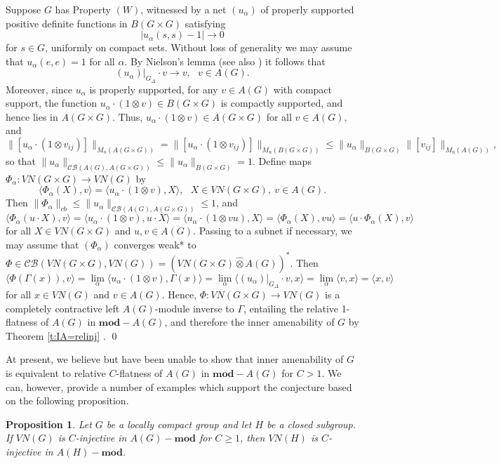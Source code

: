 \documentclass[preprint,12pt]{elsarticle}
\newtheorem{prop}[thm]{Proposition}
\newcommand{\mc}[1]{\mathcal{#1}}
\newcommand{\la}{\langle}
\newcommand{\ra}{\rangle}
\newcommand{\LG}{VN(G)}
\newcommand{\Gam}{\Gamma}
\newcommand{\ten}{\otimes}
\newcommand{\hten}{\widehat{\otimes}}
\providecommand{\norm}[1]{\lVert#1\rVert}
\begin{document}
\begin{pf} Suppose $G$ has Property $(W)$, witnessed by a net $(u_\alpha)$ of properly supported positive definite functions in $B(G\times G)$ satisfying
$$|u_\alpha(s,s)-1|\rightarrow 0$$
for $s\in G$, uniformly on compact sets. Without loss of generality we may assume that $u_\alpha(e,e)=1$ for all $\alpha$. By Nielson's lemma \cite[Lemma 10.3]{N} (see also \cite[Proposition 5.1]{dH}) it follows that
$$(u_\alpha)|_{G_\Delta}\cdot v\rightarrow v, \ \ \ v\in A(G).$$
Moreover, since $u_\alpha$ is properly supported, for any $v\in A(G)$ with compact support, the function $u_\alpha\cdot(1\ten v)\in B(G\times G)$ is compactly supported, and hence lies in $A(G\times G)$. Thus, $u_\alpha\cdot(1\ten v)\in A(G\times G)$ for all $v\in A(G)$, and
$$\norm{[u_\alpha\cdot(1\ten v_{ij})]}_{M_n(A(G\times G))}=\norm{[u_\alpha\cdot(1\ten v_{ij})]}_{M_n(B(G\times G))}\leq\norm{u_{\alpha}}_{B(G\times G)}\norm{[v_{ij}]}_{M_n(A(G))},$$
so that $\norm{u_\alpha}_{\mc{CB}(A(G),A(G\times G))}\leq\norm{u_\alpha}_{B(G\times G)}=1$. Define maps $\Phi_\alpha:VN(G\times G)\rightarrow VN(G)$ by
$$\la\Phi_\alpha(X),v\ra=\la u_\alpha\cdot(1\ten v),X\ra, \ \ \ X\in VN(G\times G), \ v\in A(G).$$
Then $\norm{\Phi_\alpha}_{cb}\leq\norm{u_\alpha}_{\mc{CB}(A(G),A(G\times G))}\leq 1$, and
$$\la\Phi_\alpha(u\cdot X),v\ra=\la u_\alpha\cdot(1\ten v),u\cdot X\ra=\la u_\alpha\cdot(1\ten vu), X\ra=\la\Phi_\alpha(X),vu\ra=\la u\cdot\Phi_\alpha(X),v\ra$$
for all $X\in VN(G\times G)$ and $u,v\in A(G)$. Passing to a subnet if necessary, we may assume that $(\Phi_\alpha)$ converges weak* to $\Phi\in\mc{CB}(VN(G\times G),VN(G))=(VN(G\times G)\hten A(G))^*$. Then 
$$\la \Phi(\Gamma(x)),v\ra=\lim_\alpha\la u_\alpha\cdot(1\ten v),\Gamma(x)\ra=\lim_\alpha\la (u_\alpha)|_{G_\Delta}\cdot v,x\ra=\lim_\alpha\la v,x\ra=\la x,v\ra$$
for all $x\in VN(G)$ and $v\in A(G)$. Hence, $\Phi:VN(G\times G)\rightarrow VN(G)$ is a completely contractive left $A(G)$-module inverse to $\Gam$, entailing the relative 1-flatness of $A(G)$ in $\mathbf{mod}-A(G)$, and therefore the inner amenability of $G$ by Theorem \ref{t:IA=relinj}   .
\qed\end{pf}

At present, we believe but have been unable to show that inner amenability of $G$ is equivalent to relative $C$-flatness of $A(G)$ in $\mathbf{mod}-A(G)$ for $C>1$. We can, however, provide a number of examples which support the conjecture based on the following proposition.

\begin{prop}\label{p:C-inj} Let $G$ be a locally compact group and let $H$ be a closed subgroup. If $\LG$ is $C$-injective in $A(G)-\mathbf{mod}$ for $C\geq 1$, then $VN(H)$ is $C$-injective in $A(H)-\mathbf{mod}$.
\end{prop}
\end{document}
